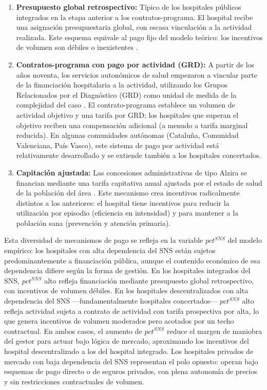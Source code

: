 \begin{enumerate}[label=(\alph*)]
  \item \textbf{Presupuesto global retrospectivo:} Típico de los hospitales públicos integrados en la etapa anterior a los contratos-programa. El hospital recibe una asignación presupuestaria global, con escasa vinculación a la actividad realizada. Este esquema equivale al pago fijo del modelo teórico: los incentivos de volumen son débiles o inexistentes \citep{garcia2009financiacion}.

  \item \textbf{Contratos-programa con pago por actividad (GRD):} 
A partir de los años noventa, los servicios autonómicos de salud 
empezaron a vincular parte de la financiación hospitalaria a la 
actividad, utilizando los Grupos Relacionados por el Diagnóstico 
(GRD) como unidad de medida de la complejidad del caso 
\citep{cots2001}. El contrato-programa establece un volumen de 
actividad objetivo y una tarifa por GRD; los hospitales que superan 
el objetivo reciben una compensación adicional (a menudo a tarifa 
marginal reducida). En algunas comunidades autónomas (Cataluña, 
Comunidad Valenciana, País Vasco), este sistema de pago por actividad 
está relativamente desarrollado y se extiende también a los hospitales 
concertados.

\item \textbf{Capitación ajustada:} Las concesiones administrativas 
de tipo Alzira se financian mediante una tarifa capitativa anual 
ajustada por el estado de salud de la población del área 
\citep{acerete2011}. Este mecanismo crea incentivos radicalmente 
distintos a los anteriores: el hospital tiene incentivos para reducir 
la utilización por episodio (eficiencia en intensidad) y para mantener 
a la población sana (prevención y atención primaria).
\end{enumerate}

Esta diversidad de mecanismos de pago se refleja en la variable 
$pct^{SNS}$ del modelo empírico: los hospitales con alta dependencia 
del SNS están sujetos predominantemente a financiación pública, aunque 
el contenido económico de esa dependencia difiere según la forma de 
gestión. En los hospitales integrados del SNS, $pct^{SNS}$ alto refleja 
financiación mediante presupuesto global retrospectivo, con incentivos 
de volumen débiles. En los hospitales descentralizados con alta 
dependencia del SNS ---fundamentalmente hospitales concertados--- 
$pct^{SNS}$ alto refleja actividad sujeta a contrato de actividad con 
tarifa prospectiva por alta, lo que genera incentivos de volumen 
moderados pero acotados por un techo contractual. En ambos casos, el 
aumento de $pct^{SNS}$ reduce el margen de maniobra del gestor para 
actuar bajo lógica de mercado, aproximando los incentivos del hospital 
descentralizado a los del hospital integrado. Los hospitales privados 
de mercado con baja dependencia del SNS representan el polo opuesto: 
operan bajo esquemas de pago directo o de seguros privados, con plena 
autonomía de precios y sin restricciones contractuales de volumen.


